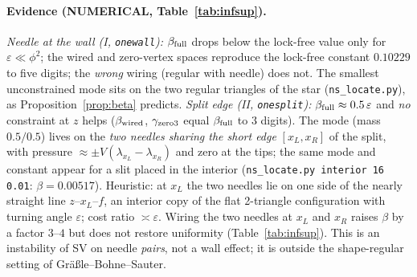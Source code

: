 \documentclass[11pt]{article}
\theoremstyle{remark}
\begin{document}
\paragraph{Evidence (NUMERICAL, Table~\ref{tab:infsup}).}
\emph{Needle at the wall (I, \texttt{onewall}):} $\beta_{\rm full}$ drops below the lock-free value only for $\varepsilon\ll\phi^2$; the wired and
zero-vertex spaces reproduce the lock-free constant $0.10229$ to five digits; the \emph{wrong} wiring (regular with needle) does not.
The smallest unconstrained mode sits on the two regular triangles of the star (\texttt{ns\_locate.py}), as Proposition~\ref{prop:beta} predicts.
\emph{Split edge (II, \texttt{onesplit}):} $\beta_{\rm full}\approx0.5\,\varepsilon$ and \emph{no} constraint at $z$ helps
($\beta_{\rm wired}$, $\gamma_{\rm zero3}$ equal $\beta_{\rm full}$ to 3 digits). The mode (mass $0.5/0.5$) lives on the
\emph{two needles sharing the short edge} $[x_L,x_R]$ of the split, with pressure $\approx\pm V(\lambda_{x_L}-\lambda_{x_R})$ and zero at the tips;
the same mode and constant appear for a slit placed in the interior (\texttt{ns\_locate.py interior 16 0.01}: $\beta=0.00517$).
Heuristic: at $x_L$ the two needles lie on one side of the nearly straight line $z$--$x_L$--$f$, an interior copy of the flat 2-triangle
configuration with turning angle $\varepsilon$; cost ratio $\asymp\varepsilon$. Wiring the two needles at $x_L$ and $x_R$ raises $\beta$ by a factor $3$--$4$ but
does not restore uniformity (Table~\ref{tab:infsup}). This is an instability of SV on needle \emph{pairs}, not a wall effect; it is
outside the shape-regular setting of Gr\"a\ss le--Bohne--Sauter.
\end{document}
